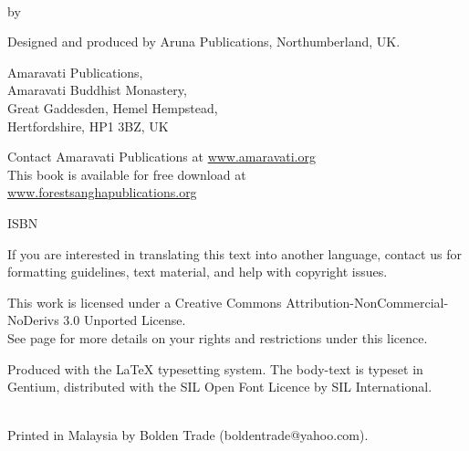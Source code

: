 {\setlength{\parskip}{0.8em}\setlength{\parindent}{0em}%
\footnotesize
{\raggedright%

\thetitle\\
by \theauthor

Designed and produced by Aruna Publications, Northumberland, UK.

\copyrightText

Amaravati Publications,\\
Amaravati Buddhist Monastery,\\
Great Gaddesden, Hemel Hempstead,\\
Hertfordshire, HP1 3BZ, UK

Contact Amaravati Publications at \href{http://amaravati.org}{www.amaravati.org}\\
This book is available for free download at\\
\href{http://forestsanghapublications.org/}{www.forestsanghapublications.org}

ISBN \theISBN

If you are interested in translating this text into another language, contact us for formatting guidelines, text material, and help with copyright issues.

This work is licensed under a Creative Commons Attribution-NonCommercial-NoDerivs 3.0 Unported License.\\
See page \pageref{copyright-details} for more details on your rights and restrictions under this licence.

Produced with the {\selectfont\LaTeX} typesetting system. The body-text is typeset in Gentium, distributed with the SIL Open Font Licence by SIL International.

\theEditionInfo\\
Printed in Malaysia by Bolden Trade (boldentrade@yahoo.com).

}}

